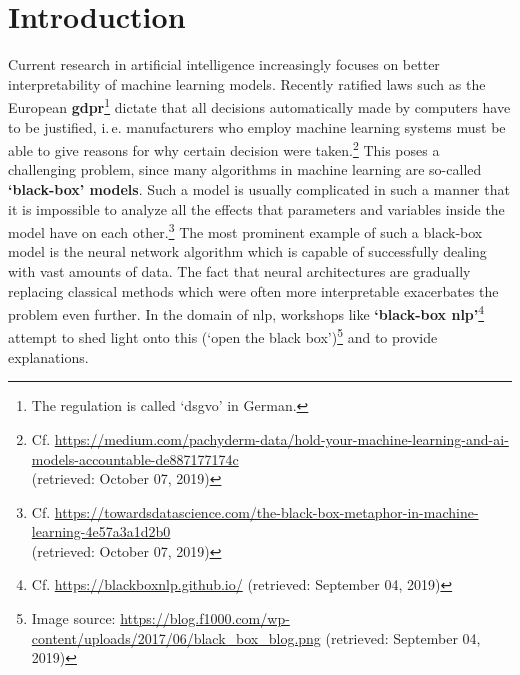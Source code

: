 %
%

\section{Introduction}
\label{sec:introduction}

Current research in artificial intelligence increasingly focuses on better interpretability of machine learning models. Recently ratified laws such as the European \textbf{\gls{gdpr}}\footnote{The regulation is called `\gls{dsgvo}' in German.} dictate that all decisions automatically made by computers have to be justified, i.\,e. manufacturers who employ machine learning systems must be able to give reasons for why certain decision were taken.\footnote{Cf. \url{https://medium.com/pachyderm-data/hold-your-machine-learning-and-ai-models-accountable-de887177174c} \\ (retrieved: October 07, 2019)} This poses a challenging problem, since many algorithms in machine learning are so-called \textbf{`black-box' models}. Such a model is usually complicated in such a manner that it is impossible to analyze all the effects that parameters and variables inside the model have on each other.\footnote{Cf. \url{https://towardsdatascience.com/the-black-box-metaphor-in-machine-learning-4e57a3a1d2b0} \\ (retrieved: October 07, 2019)} The most prominent example of such a black-box model is the neural network algorithm which is capable of successfully dealing with vast amounts of data. The fact that neural architectures are gradually replacing classical methods which were often more interpretable exacerbates the problem even further. In the domain of \gls{nlp}, workshops like \textbf{`black-box \gls{nlp}'}\footnote{Cf. \url{https://blackboxnlp.github.io/} (retrieved: September 04, 2019)} attempt to shed light onto this (`open the black box')\footnote{Image source: \url{https://blog.f1000.com/wp-content/uploads/2017/06/black_box_blog.png} (retrieved: September 04, 2019)} and to provide explanations.


